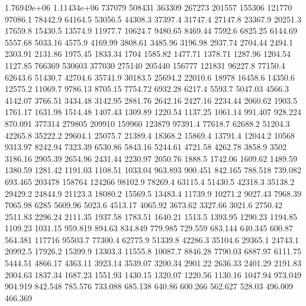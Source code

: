 1.76949e+06      1.11434e+06      737079      508431      363309      267273      201557      155306      121770      97086.1      78442.9      64164.5      53056.5      44308.3      37397.4      31747.4      27147.8      23367.9      20251.3      17659.8      15430.5      13574.9      11977.7      10624.7      9480.65      8469.44      7592.6      6825.25      6144.69      5557.68      5033.16      4575.9      4169.99      3808.61      3485.96      3196.98      2937.74      2704.44      2494.1      2303.91      2131.86      1975.45      1833.34      1704      1585.82      1477.71      1378.71      1287.96      1204.54      1127.85      
766369      530603      377030      275140      205440      156777      121831      96227.8      77150.4      62643.6      51430.7      42704.6      35741.9      30183.5      25694.2      22010.6      18978      16458.6      14350.6      12575.2      11069.7      9786.13      8705.15      7754.72      6932.28      6217.4      5593.7      5047.03      4566.3      4142.07      3766.51      3434.48      3142.95      2881.76      2642.16      2427.16      2234.44      2060.62      1903.5      1761.17      1631.98      1514.48      1407.43      1309.89      1220.54      1137.25      1061.14      991.407      928.224      870.091      
377314      279805      209910      159960      123879      97391.4      77618.7      62688.2      51204.3      42265.8      35222.2      29604.1      25075.7      21389.4      18368.2      15869.4      13791.4      12044.2      10568      9313.97      8242.94      7323.39      6530.86      5843.16      5244.61      4721.58      4262.78      3858.9      3502      3186.16      2905.39      2654.96      2431.44      2230.97      2050.76      1888.5      1742.06      1609.62      1489.59      1380.59      1281.42      1191.03      1108.51      1033.04      963.893      900.451      842.165      788.518      739.082      693.465      
203478      158764      124266      98102.9      78269.4      63115.4      51430.5      42318.3      35138.2      29429.2      24844.9      21123.3      18080.2      15569.5      13483.4      11739.9      10271.2      9027.43      7968.39      7065.98      6285      5609.96      5023.6      4513.17      4065.92      3673.62      3327.66      3021.6      2750.42      2511.83      2296.24      2111.35      1937.58      1783.51      1640.21      1513.5      1393.95      1290.23      1194.85      1109.23      1031.15      959.819      894.63      834.849      779.985      729.559      683.144      640.345      600.87      564.381      
117716      95503.7      77300.4      62775.9      51339.8      42286.3      35104.6      29365.1      24743.1      20992.5      17926.2      15399.9      13303.3      11555.8      10087.7      8846.28      7790.03      6887.97      6111.75      5444.51      4866.17      4363.11      3923.14      3539.07      3200.34      2901.22      2636.33      2401.29      2191.83      2004.63      1837.34      1687.23      1551.93      1430.15      1320.07      1220.56      1130.16      1047.94      973.049      904.919      842.548      785.576      733.088      685.138      640.86      600.266      562.627      528.03      496.009      466.369      
